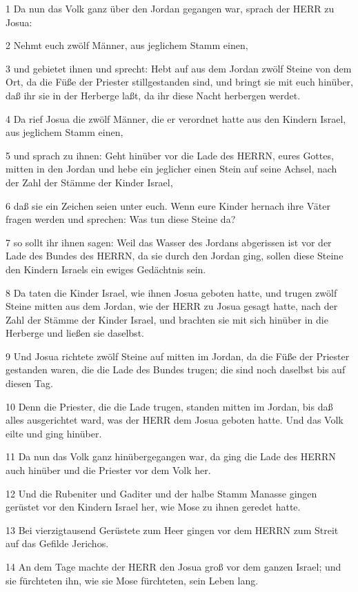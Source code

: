 \par 1 Da nun das Volk ganz über den Jordan gegangen war, sprach der HERR zu Josua:
\par 2 Nehmt euch zwölf Männer, aus jeglichem Stamm einen,
\par 3 und gebietet ihnen und sprecht: Hebt auf aus dem Jordan zwölf Steine von dem Ort, da die Füße der Priester stillgestanden sind, und bringt sie mit euch hinüber, daß ihr sie in der Herberge laßt, da ihr diese Nacht herbergen werdet.
\par 4 Da rief Josua die zwölf Männer, die er verordnet hatte aus den Kindern Israel, aus jeglichem Stamm einen,
\par 5 und sprach zu ihnen: Geht hinüber vor die Lade des HERRN, eures Gottes, mitten in den Jordan und hebe ein jeglicher einen Stein auf seine Achsel, nach der Zahl der Stämme der Kinder Israel,
\par 6 daß sie ein Zeichen seien unter euch. Wenn eure Kinder hernach ihre Väter fragen werden und sprechen: Was tun diese Steine da?
\par 7 so sollt ihr ihnen sagen: Weil das Wasser des Jordans abgerissen ist vor der Lade des Bundes des HERRN, da sie durch den Jordan ging, sollen diese Steine den Kindern Israels ein ewiges Gedächtnis sein.
\par 8 Da taten die Kinder Israel, wie ihnen Josua geboten hatte, und trugen zwölf Steine mitten aus dem Jordan, wie der HERR zu Josua gesagt hatte, nach der Zahl der Stämme der Kinder Israel, und brachten sie mit sich hinüber in die Herberge und ließen sie daselbst.
\par 9 Und Josua richtete zwölf Steine auf mitten im Jordan, da die Füße der Priester gestanden waren, die die Lade des Bundes trugen; die sind noch daselbst bis auf diesen Tag.
\par 10 Denn die Priester, die die Lade trugen, standen mitten im Jordan, bis daß alles ausgerichtet ward, was der HERR dem Josua geboten hatte. Und das Volk eilte und ging hinüber.
\par 11 Da nun das Volk ganz hinübergegangen war, da ging die Lade des HERRN auch hinüber und die Priester vor dem Volk her.
\par 12 Und die Rubeniter und Gaditer und der halbe Stamm Manasse gingen gerüstet vor den Kindern Israel her, wie Mose zu ihnen geredet hatte.
\par 13 Bei vierzigtausend Gerüstete zum Heer gingen vor dem HERRN zum Streit auf das Gefilde Jerichos.
\par 14 An dem Tage machte der HERR den Josua groß vor dem ganzen Israel; und sie fürchteten ihn, wie sie Mose fürchteten, sein Leben lang.
